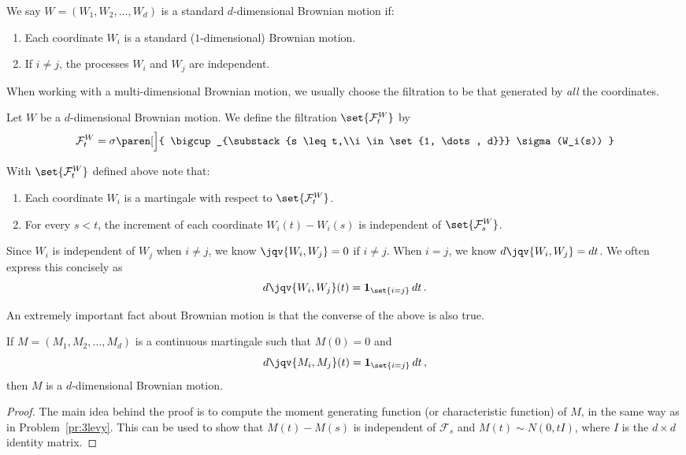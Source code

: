 \begin{definition}
  We say $W = (W_1, W_2, \dots, W_d)$ is a standard $d$-dimensional Brownian motion if:
  \begin{enumerate}
    \item
      Each coordinate $W_i$ is a standard ($1$-dimensional) Brownian motion.
    \item
      If $i \neq j$, the processes $W_i$ and $W_j$ are independent.
  \end{enumerate}
\end{definition}

When working with a multi-dimensional Brownian motion, we usually choose the filtration to be that generated by \emph{all} the coordinates.

\begin{definition}
  Let $W$ be a $d$-dimensional Brownian motion.
  We define the filtration $\set{\mathcal F_t^W}$ by
  \begin{equation*}
    \mathcal F_t^W = \sigma\paren[\Big]{ \bigcup_{\substack{s \leq t,\\i \in \set{1, \dots, d}}} \sigma(W_i(s)) }
  \end{equation*}
\end{definition}

With $\set{\mathcal F_t^W}$ defined above note that:
\begin{enumerate}
  \item
    Each coordinate $W_i$ is a martingale with respect to $\set{\mathcal F_t^W}$.

  \item
    For every $s < t$, the increment of each coordinate $W_i(t) - W_i(s)$ is independent of $\set{\mathcal F_s^W}$.
\end{enumerate}

\begin{remark}
  Since $W_i$ is independent of $W_j$ when $i \neq j$, we know $\jqv{W_i, W_j} = 0$ if $i \neq j$.
  When $i = j$, we know $d\jqv{W_i, W_j} = dt$.
  We often express this concisely as
  \begin{equation*}
    d\jqv{W_i, W_j}(t) = \one_{\set{i = j}} \, dt\,.
  \end{equation*}
\end{remark}

An extremely important fact about Brownian motion is that the converse of the above is also true.

\begin{theorem}[L\'evy]
  If $M = (M_1, M_2, \dots, M_d)$ is a continuous martingale such that $M(0) = 0$ and
  \begin{equation*}
    d\jqv{M_i, M_j}(t) = \one_{\set{i = j}} \, dt\,,
  \end{equation*}
  then $M$ is a $d$-dimensional Brownian motion.
\end{theorem}
\begin{proof}
  The main idea behind the proof is to compute the moment generating function (or characteristic function) of $M$, in the same way as in Problem~\ref{pr:3levy}.
  This can be used to show that $M(t) - M(s)$ is independent of $\mathcal F_s$ and $M(t) \sim N(0, t I)$, where $I$ is the $d \times d$ identity matrix.
\end{proof}


